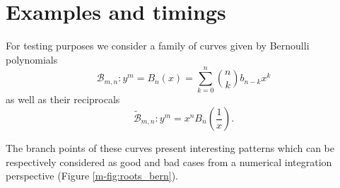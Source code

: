 \documentclass[main.tex]{subfiles}
\begin{document}
  \section{Examples and timings}\label{sec:examples_timings}

    \newcommand{\bern}{\mathcal{B}}
  \newcommand{\bernrev}{\widetilde{\bern}}

  For testing purposes we consider a family of curves given by Bernoulli polynomials
          \begin{equation*}
              \bern_{m,n} : y^m = B_n(x) = \sum_{k=0}^n\binom nkb_{n-k}x^k
          \end{equation*}
  as well as their reciprocals
  \begin{equation*}
  \bernrev_{m,n} : y^m = x^nB_n\left(\frac1x\right).
  \end{equation*}

  The branch points of these curves present interesting patterns which can be respectively considered
  as good and bad cases from a numerical integration perspective (Figure \ref{m-fig:roots_bern}).
\end{document}
